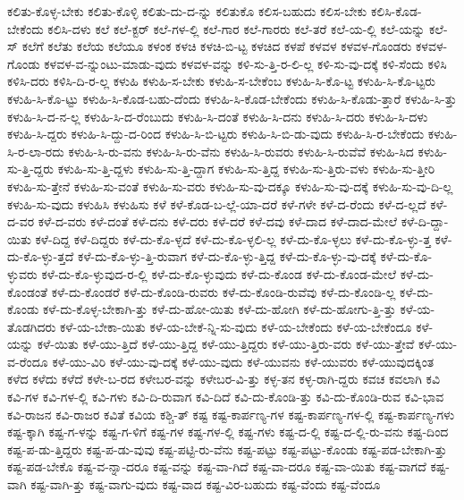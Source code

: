 {ಕಲಿತು-ಕೊಳ್ಳ-ಬೇಕು
ಕಲಿತು-ಕೊಳ್ಳಿ
ಕಲಿತು-ದು-ದ-ನ್ನು
ಕಲಿತುಕೊ
ಕಲಿಸ-ಬಹುದು
ಕಲಿಸ-ಬೇಕು
ಕಲಿಸಿ-ಕೊಡ-ಬೇಕೆಂದು
ಕಲಿಸಿ-ದಳು
ಕಲೆ
ಕಲೆ-ಕ್ಟರ್
ಕಲೆ-ಗಳ-ಲ್ಲಿ
ಕಲೆ-ಗಾರ
ಕಲೆ-ಗಾರರು
ಕಲೆ-ತರೆ
ಕಲೆ-ಯ-ಲ್ಲಿ
ಕಲೆ-ಯನ್ನು
ಕಲೆ-ಸ್
ಕಲೆಗೆ
ಕಲೆತು
ಕಲೆಯ
ಕಲೆಯೂ
ಕಳಂಕ
ಕಳಚಿ
ಕಳಚಿ-ಬಿ-ಟ್ಟ
ಕಳಚಿದ
ಕಳಪೆ
ಕಳವಳ
ಕಳವಳ-ಗೊಂಡರು
ಕಳವಳ-ಗೊಂಡು
ಕಳವಳ-ವ-ನ್ನುಂಟು-ಮಾಡು-ವುದು
ಕಳವಳ-ವನ್ನು
ಕಳಿ-ಸು-ತ್ತಿ-ರ-ಲಿ-ಲ್ಲ
ಕಳಿ-ಸು-ವು-ದಕ್ಕೆ
ಕಳಿ-ಸೆಂದು
ಕಳಿಸಿ
ಕಳಿಸಿ-ದರು
ಕಳಿಸಿ-ದಿ-ರ-ಲ್ಲ
ಕಳುಹಿ
ಕಳುಹಿ-ಸ-ಬೇಕು
ಕಳುಹಿ-ಸ-ಬೇಕೆಂಬ
ಕಳುಹಿ-ಸಿ-ಕೊ-ಟ್ಟ
ಕಳುಹಿ-ಸಿ-ಕೊ-ಟ್ಟರು
ಕಳುಹಿ-ಸಿ-ಕೊ-ಟ್ಟು
ಕಳುಹಿ-ಸಿ-ಕೊಡ-ಬಹು-ದೆಂದು
ಕಳುಹಿ-ಸಿ-ಕೊಡ-ಬೇಕೆಂದು
ಕಳುಹಿ-ಸಿ-ಕೊಡು-ತ್ತಾರೆ
ಕಳುಹಿ-ಸಿ-ತ್ತು
ಕಳುಹಿ-ಸಿ-ದ-ನ-ಲ್ಲ
ಕಳುಹಿ-ಸಿ-ದ-ರೆಂಬುದು
ಕಳುಹಿ-ಸಿ-ದಂತೆ
ಕಳುಹಿ-ಸಿ-ದನು
ಕಳುಹಿ-ಸಿ-ದರು
ಕಳುಹಿ-ಸಿ-ದಳು
ಕಳುಹಿ-ಸಿ-ದ್ದರು
ಕಳುಹಿ-ಸಿ-ದ್ದು-ದ-ರಿಂದ
ಕಳುಹಿ-ಸಿ-ಬಿ-ಟ್ಟರು
ಕಳುಹಿ-ಸಿ-ಬಿ-ಡು-ವುದು
ಕಳುಹಿ-ಸಿ-ರ-ಬೇಕೆಂದು
ಕಳುಹಿ-ಸಿ-ರ-ಲಾ-ರದು
ಕಳುಹಿ-ಸಿ-ರು-ವನು
ಕಳುಹಿ-ಸಿ-ರು-ವೆನು
ಕಳುಹಿ-ಸಿ-ರುವರು
ಕಳುಹಿ-ಸಿ-ರುವೆವೆ
ಕಳುಹಿ-ಸಿದ
ಕಳುಹಿ-ಸು-ತ್ತಿ-ದ್ದರು
ಕಳುಹಿ-ಸು-ತ್ತಿ-ದ್ದಳು
ಕಳುಹಿ-ಸು-ತ್ತಿ-ದ್ದಾಗ
ಕಳುಹಿ-ಸು-ತ್ತಿದ್ದ
ಕಳುಹಿ-ಸು-ತ್ತಿರು-ವಳು
ಕಳುಹಿ-ಸು-ತ್ತೀರಿ
ಕಳುಹಿ-ಸು-ತ್ತೇನೆ
ಕಳುಹಿ-ಸು-ವಂತೆ
ಕಳುಹಿ-ಸು-ವರು
ಕಳುಹಿ-ಸು-ವು-ದಕ್ಕೂ
ಕಳುಹಿ-ಸು-ವು-ದಕ್ಕೆ
ಕಳುಹಿ-ಸು-ವು-ದಿ-ಲ್ಲ
ಕಳುಹಿ-ಸು-ವುದು
ಕಳುಹಿಸಿ
ಕಳುಹಿಸು
ಕಳೆ
ಕಳೆ-ಕೊಡ-ಬ-ಲ್ಲೆ-ಯಾ-ದರೆ
ಕಳೆ-ಗಳೇ
ಕಳೆ-ದ-ರೆಂದು
ಕಳೆ-ದ-ಲ್ಲದೆ
ಕಳೆ-ದ-ವರ
ಕಳೆ-ದ-ವರು
ಕಳೆ-ದಂತೆ
ಕಳೆ-ದನು
ಕಳೆ-ದರು
ಕಳೆ-ದರೆ
ಕಳೆ-ದವು
ಕಳೆ-ದಾದ
ಕಳೆ-ದಾದ-ಮೇಲೆ
ಕಳೆ-ದಿ-ದ್ದಾ-ಯಿತು
ಕಳೆ-ದಿದ್ದ
ಕಳೆ-ದಿದ್ದರು
ಕಳೆ-ದು-ಕೊ-ಳ್ಳದೆ
ಕಳೆ-ದು-ಕೊ-ಳ್ಳಲಿ-ಲ್ಲ
ಕಳೆ-ದು-ಕೊ-ಳ್ಳಲು
ಕಳೆ-ದು-ಕೊ-ಳ್ಳು-ತ್ತ
ಕಳೆ-ದು-ಕೊ-ಳ್ಳು-ತ್ತದೆ
ಕಳೆ-ದು-ಕೊ-ಳ್ಳು-ತ್ತಿ-ರುವಾಗ
ಕಳೆ-ದು-ಕೊ-ಳ್ಳು-ತ್ತಿದ್ದ
ಕಳೆ-ದು-ಕೊ-ಳ್ಳು-ವು-ದಕ್ಕೆ
ಕಳೆ-ದು-ಕೊ-ಳ್ಳುವರು
ಕಳೆ-ದು-ಕೊ-ಳ್ಳುವುದ-ರ-ಲ್ಲಿ
ಕಳೆ-ದು-ಕೊ-ಳ್ಳುವುದು
ಕಳೆ-ದು-ಕೊಂಡ
ಕಳೆ-ದು-ಕೊಂಡ-ಮೇಲೆ
ಕಳೆ-ದು-ಕೊಂಡಂತೆ
ಕಳೆ-ದು-ಕೊಂಡರೆ
ಕಳೆ-ದು-ಕೊಂಡಿ-ರುವರು
ಕಳೆ-ದು-ಕೊಂಡಿ-ರುವೆವು
ಕಳೆ-ದು-ಕೊಂಡಿ-ಲ್ಲ
ಕಳೆ-ದು-ಕೊಂಡು
ಕಳೆ-ದು-ಕೊಳ್ಳ-ಬೇಕಾಗಿ-ತ್ತು
ಕಳೆ-ದು-ಹೋ-ಯಿತು
ಕಳೆ-ದು-ಹೋಗಿ
ಕಳೆ-ದು-ಹೋಗು-ತ್ತಿ-ತ್ತು
ಕಳೆ-ಯ-ತೊಡಗಿದರು
ಕಳೆ-ಯ-ಬೇಕಾ-ಯಿತು
ಕಳೆ-ಯ-ಬೇಕೆ-ನ್ನಿ-ಸು-ವುದು
ಕಳೆ-ಯ-ಬೇಕೆಂದು
ಕಳೆ-ಯ-ಬೇಕೆಂದೂ
ಕಳೆ-ಯನ್ನು
ಕಳೆ-ಯಿತು
ಕಳೆ-ಯು-ತ್ತಿದೆ
ಕಳೆ-ಯು-ತ್ತಿದ್ದ
ಕಳೆ-ಯು-ತ್ತಿದ್ದರು
ಕಳೆ-ಯು-ತ್ತಿರು-ವರು
ಕಳೆ-ಯು-ತ್ತೇವೆ
ಕಳೆ-ಯು-ವ-ರೆಂದೂ
ಕಳೆ-ಯು-ವಿರಿ
ಕಳೆ-ಯು-ವು-ದಕ್ಕೆ
ಕಳೆ-ಯು-ವುದು
ಕಳೆ-ಯುವನು
ಕಳೆ-ಯುವರು
ಕಳೆ-ಯುವುದಕ್ಕಿಂತ
ಕಳೆದ
ಕಳೆದು
ಕಳೆದೆ
ಕಳೇ-ಬ-ರದ
ಕಳೇಬರ-ವನ್ನು
ಕಳೇಬರ-ವಿ-ತ್ತು
ಕಳ್ಳ-ತನ
ಕಳ್ಳ-ರಾಗಿ-ದ್ದರು
ಕವಚ
ಕವಲಾಗಿ
ಕವಿ
ಕವಿ-ಗಳ
ಕವಿ-ಗಳ-ಲ್ಲಿ
ಕವಿ-ಗಳು
ಕವಿ-ದಿ-ರುವಾಗ
ಕವಿ-ದಿದೆ
ಕವಿ-ದು-ಕೊಂಡಿ-ತ್ತು
ಕವಿ-ದು-ಕೊಂಡಿ-ರುವ
ಕವಿ-ಭಾವ
ಕವಿ-ರಾಜನ
ಕವಿ-ರಾಜರ
ಕವಿತೆ
ಕವಿಯ
ಕಶ್ಚಿ-ತ್
ಕಷ್ಟ
ಕಷ್ಟ-ಕಾರ್ಪಣ್ಯ-ಗಳ
ಕಷ್ಟ-ಕಾರ್ಪಣ್ಯ-ಗಳ-ಲ್ಲಿ
ಕಷ್ಟ-ಕಾರ್ಪಣ್ಯ-ಗಳು
ಕಷ್ಟ-ಕ್ಕಾಗಿ
ಕಷ್ಟ-ಗ-ಳನ್ನು
ಕಷ್ಟ-ಗ-ಳಿಗೆ
ಕಷ್ಟ-ಗಳ
ಕಷ್ಟ-ಗಳ-ಲ್ಲಿ
ಕಷ್ಟ-ಗಳು
ಕಷ್ಟ-ದ-ಲ್ಲಿ
ಕಷ್ಟ-ದ-ಲ್ಲಿ-ರು-ವನು
ಕಷ್ಟ-ದಿಂದ
ಕಷ್ಟ-ಪ-ಡು-ತ್ತಿದ್ದರು
ಕಷ್ಟ-ಪ-ಡು-ವುವು
ಕಷ್ಟ-ಪಟ್ಟಿ-ರು-ವೆನು
ಕಷ್ಟ-ಪಟ್ಟು
ಕಷ್ಟ-ಪಟ್ಟು-ಕೊಂಡು
ಕಷ್ಟ-ಪಡ-ಬೇಕಾಗಿ-ತ್ತು
ಕಷ್ಟ-ಪಡ-ಬೇಕೊ
ಕಷ್ಟ-ವ-ನ್ನಾ-ದರೂ
ಕಷ್ಟ-ವನ್ನು
ಕಷ್ಟ-ವಾ-ಗಿದೆ
ಕಷ್ಟ-ವಾ-ದರೂ
ಕಷ್ಟ-ವಾ-ಯಿತು
ಕಷ್ಟ-ವಾಗದೆ
ಕಷ್ಟ-ವಾಗಿ
ಕಷ್ಟ-ವಾಗಿ-ತ್ತು
ಕಷ್ಟ-ವಾಗು-ವುದು
ಕಷ್ಟ-ವಾದ
ಕಷ್ಟ-ವಿರ-ಬಹುದು
ಕಷ್ಟ-ವೆಂದು
ಕಷ್ಟ-ವೆಂದೂ
}
